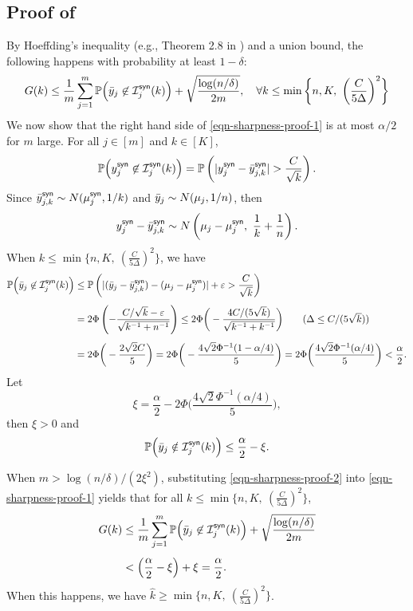 \subsection{Proof of }\label{sec-thm-sharpness-1D-proof}

By Hoeffding's inequality (e.g., Theorem 2.8 in \cite{BLM13}) and a union bound, the following happens with probability at least $1-\delta$:
\begin{equation}\label{eqn-sharpness-proof-1}
G(k) \le \frac{1}{m} \sum_{j=1}^m \mathbb{P}\Big( \bar{y}_j \not\in \mathcal{I}^{\mathsf{syn}}_j(k) \Big)  +  \sqrt{\frac{\log(n/\delta)}{2m}}
,\quad \forall k \le \min \bigg\{ n,K,~ \bigg(\frac{C}{5 \Delta}\bigg)^2 \bigg\}
\end{equation}
We now show that the right hand side of \eqref{eqn-sharpness-proof-1} is at most $\alpha/2$ for $m$ large. For all $j\in[m]$ and $k \in [K]$,
\[
\mathbb{P} \Big( y^{\mathsf{syn}}_{j} \not\in \mathcal{I}^{\mathsf{syn}}_{j}(k) \Big)
= \mathbb{P} \left(|y^{\mathsf{syn}}_j -\bar{y}^{\mathsf{syn}}_{j, k} | > \frac{C}{\sqrt{k}} \right).
\]
Since $\bar{y}^{\mathsf{syn}}_{j, k} \sim N( \mu^{\mathsf{syn}}_{j} , 1/k )$ and $\bar{y}_j \sim N( \mu_{j}, 1/n )$, then
\[
y^{\mathsf{syn}}_j -
\bar{y}^{\mathsf{syn}}_{j, k} 
\sim N \left( 
\mu_{j} - \mu^{\mathsf{syn}}_{j}
, ~ \frac{1}{k} + \frac{1}{n} \right).
\]
When $k \leq \min \{ n,K,~ (\frac{C}{5 \Delta})^2 \}$, we have
\begin{align*}
\PP \Big( \bar{\response}_{j} \not\in \simCI_{j}(k) \Big) 
&\le \PP \left(
|
(\bar\response_j - \simresponsebar_{j, k} )
- (\mean_{j} - \simmean_{j})
|
+ \varepsilon > \frac{C}{\sqrt{k}}
\right)
\\[4pt]
& = 2 \Phi\left(
- \frac{C / \sqrt{k} - \varepsilon}{\sqrt{ k^{-1} + n^{-1} }}
\right)
\le 
2  \Phi\bigg(
- \frac{4	C / (5 \sqrt{k} )}{\sqrt{ k^{-1} + k^{-1} }}\bigg) \tag{$\Delta\le C/(5\sqrt{k})$} \\[4pt]
&= 2  \Phi \bigg(
- \frac{
2 \sqrt{2}	C 
}{
5
}
\bigg)
= 2  \Phi \bigg(
- \frac{
	4 \sqrt{2}	\Phi^{-1}(1 - \alpha/4)
}{
	5
}
\bigg)
=
2  \Phi \bigg(
\frac{
	4 \sqrt{2}	\Phi^{-1}(\alpha/4)
}{
	5
}
\bigg) < \frac{\alpha}{2}.
\end{align*}
Let
\[
\xi = \frac{\alpha}{2} - 2  \Phi \bigg(
\frac{
	4 \sqrt{2}	\Phi^{-1}(\alpha/4)
}{
	5
}
\bigg),
\]
then $\xi > 0$ and
\begin{equation}\label{eqn-sharpness-proof-2}
\mathbb{P} \Big(\bar{y}_{j} \notin \mathcal{I}^{\mathsf{syn}}_{j}(k) \Big) \le  \frac{\alpha}{2} - \xi.
\end{equation}

When $m > \log(n / \delta) / (2\xi^2)$, substituting \eqref{eqn-sharpness-proof-2} into \eqref{eqn-sharpness-proof-1} yields that for all $k \le \min\{ n , K, ~ ( \frac{C}{5\Delta})^2 \}$,
\begin{align*}
G(k) 
&\le 
\frac{1}{m} \sum_{j=1}^m \mathbb{P}\Big( \bar{y}_j \not\in \mathcal{I}^{\mathsf{syn}}_j(k) \Big)  +  \sqrt{\frac{\log(n/\delta)}{2m}} \\[4pt]
&<
\left( \frac{\alpha}{2} - \xi \right) + \xi = \frac{\alpha}{2}.
\end{align*}
When this happens, we have $\widehat{k} \ge \min  \{ n , K,~  (\frac{C}{5 \Delta} )^2  \}$. 


